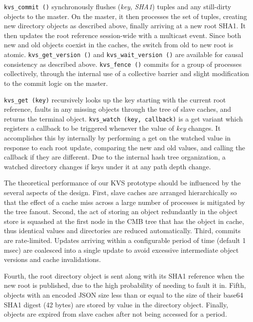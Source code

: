{\tt kvs\_commit ()} synchronously flushes ({\em key, SHA1}) tuples
and any still-dirty objects to the master.  On the master, it then
processes the set of tuples, creating new directory objects as described
above, finally arriving at a new root SHA1.  It then updates the 
root reference session-wide with a multicast event.
Since both new and old objects coexist in the caches, the switch from old
to new root is atomic.
{\tt kvs\_get\_version ()} and {\tt kvs\_wait\_version ()} are available
for causal consistency as described above.
{\tt kvs\_fence ()} commits for a group of processes collectively,
through the internal use of a collective barrier
and slight modification to the commit logic on the master.

{\tt kvs\_get (key)} recursively looks up the key starting with the
current root reference, faults in any missing objects
through the tree of slave caches, and returns the terminal object.
{\tt kvs\_watch (key, callback)} is a get variant which registers a
callback to be triggered whenever the value of {\em key} changes.
It accomplishes this by internally by performing a get on the watched
value in response to each root update, comparing the new
and old values, and calling the callback if they are different.
Due to the internal hash tree organization, a watched directory changes
if keys under it at any path depth change.

The theoretical performance of our KVS prototype should be influenced by
the several aspects of the design. First,  
slave caches are arranged hierarchically so that the effect of a
cache miss across a large number of processes is mitigated by the tree
fanout. Second, the act of storing an object redundantly in the object store
is squashed at the first node in the CMB tree that has the object
in cache, thus identical values and directories are reduced automatically.
Third, commits are rate-limited.  Updates arriving within a configurable
period of time (default 1 msec) are coalesced into a single update to
avoid excessive intermediate object versions and cache invalidations.

Fourth, the root directory object is sent along with its SHA1 reference when the
new root is published, due to the high probability of needing to fault it in.
Fifth, objects with an encoded JSON size less than or equal to the size
of their base64 SHA1 digest (42 bytes) are stored by value in the directory
object. Finally, objects are expired from slave caches after not being accessed for
a period. %

%
